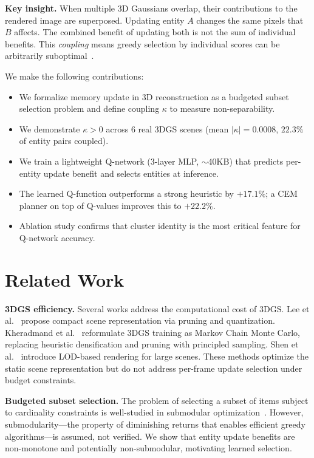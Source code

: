 \documentclass[10pt,twocolumn]{article}
\begin{document}
\textbf{Key insight.} When multiple 3D Gaussians overlap, their contributions to the rendered image are superposed. Updating entity $A$ changes the same pixels that $B$ affects. The combined benefit of updating both is not the sum of individual benefits. This \textit{coupling} means greedy selection by individual scores can be arbitrarily suboptimal~\cite{krause2005near}.

We make the following contributions:
\begin{itemize}
    \item We formalize memory update in 3D reconstruction as a budgeted subset selection problem and define coupling $\kappa$ to measure non-separability.
    \item We demonstrate $\kappa > 0$ across 6 real 3DGS scenes (mean $|\kappa|=0.0008$, $22.3\%$ of entity pairs coupled).
    \item We train a lightweight Q-network (3-layer MLP, $\sim$40KB) that predicts per-entity update benefit and selects entities at inference.
    \item The learned Q-function outperforms a strong heuristic by $+17.1\%$; a CEM planner on top of Q-values improves this to $+22.2\%$.
    \item Ablation study confirms that cluster identity is the most critical feature for Q-network accuracy.
\end{itemize}

\section{Related Work}

\textbf{3DGS efficiency.} Several works address the computational cost of 3DGS. Lee et al.~\cite{lee2024compact} propose compact scene representation via pruning and quantization. Kheradmand et al.~\cite{kheradmand2024mcmc} reformulate 3DGS training as Markov Chain Monte Carlo, replacing heuristic densification and pruning with principled sampling. Shen et al.~\cite{shen2025lodgs} introduce LOD-based rendering for large scenes. These methods optimize the static scene representation but do not address per-frame update selection under budget constraints.

\textbf{Budgeted subset selection.} The problem of selecting a subset of items subject to cardinality constraints is well-studied in submodular optimization~\cite{krause2005near,tohidi2020submodularity}. However, submodularity---the property of diminishing returns that enables efficient greedy algorithms---is assumed, not verified. We show that entity update benefits are non-monotone and potentially non-submodular, motivating learned selection.
\end{document}
